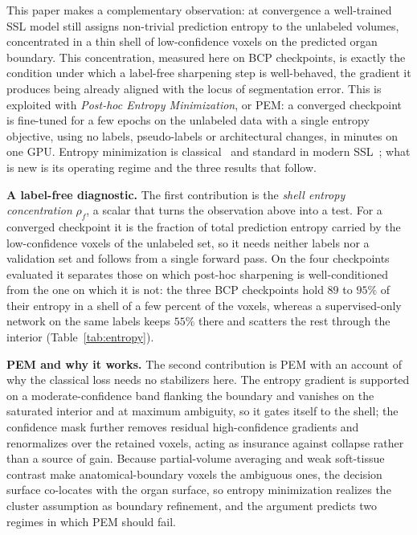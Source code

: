 \documentclass[conference]{IEEEtran}
\begin{document}
This paper makes a complementary observation: at convergence a well-trained SSL model still assigns non-trivial prediction entropy to the unlabeled volumes, concentrated in a thin shell of low-confidence voxels on the predicted organ boundary. This concentration, measured here on BCP checkpoints, is exactly the condition under which a label-free sharpening step is well-behaved, the gradient it produces being already aligned with the locus of segmentation error. This is exploited with \textit{Post-hoc Entropy Minimization}, or PEM: a converged checkpoint is fine-tuned for a few epochs on the unlabeled data with a single entropy objective, using no labels, pseudo-labels or architectural changes, in minutes on one GPU. Entropy minimization is classical~\cite{grandvalet2004entropy} and standard in modern SSL~\cite{sohn2020fixmatch}; what is new is its operating regime and the three results that follow.

\noindent\textbf{A label-free diagnostic.}
The first contribution is the \textit{shell entropy concentration} $\rho_f$, a scalar that turns the observation above into a test. For a converged checkpoint it is the fraction of total prediction entropy carried by the low-confidence voxels of the unlabeled set, so it needs neither labels nor a validation set and follows from a single forward pass. On the four checkpoints evaluated it separates those on which post-hoc sharpening is well-conditioned from the one on which it is not: the three BCP checkpoints hold $89$ to $95\%$ of their entropy in a shell of a few percent of the voxels, whereas a supervised-only network on the same labels keeps $55\%$ there and scatters the rest through the interior (Table~\ref{tab:entropy}).

\noindent\textbf{PEM and why it works.}
The second contribution is PEM with an account of why the classical loss needs no stabilizers here. The entropy gradient is supported on a moderate-confidence band flanking the boundary and vanishes on the saturated interior and at maximum ambiguity, so it gates itself to the shell; the confidence mask further removes residual high-confidence gradients and renormalizes over the retained voxels, acting as insurance against collapse rather than a source of gain. Because partial-volume averaging and weak soft-tissue contrast make anatomical-boundary voxels the ambiguous ones, the decision surface co-locates with the organ surface, so entropy minimization realizes the cluster assumption as boundary refinement, and the argument predicts two regimes in which PEM should fail.
\end{document}
